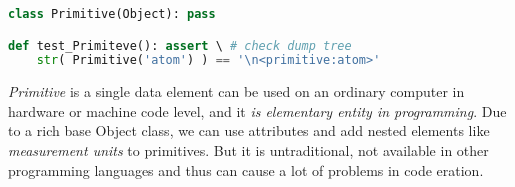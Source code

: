 \clearpage{}\secdown

\begin{lstlisting}[language=Python]
class Primitive(Object): pass

def test_Primiteve(): assert \ # check dump tree
	str( Primitive('atom') ) == '\n<primitive:atom>'
\end{lstlisting}

\noindent
\emph{Primitive} is a single data element can be used on an ordinary computer in
hardware or machine code level, and it \emph{is elementary entity in
programming}. Due to a rich base Object class, we can use attributes and add
nested elements like \emph{measurement units} to primitives. But it is
untraditional, not available in other programming languages and thus can cause a
lot of problems in code eration.





\secup
